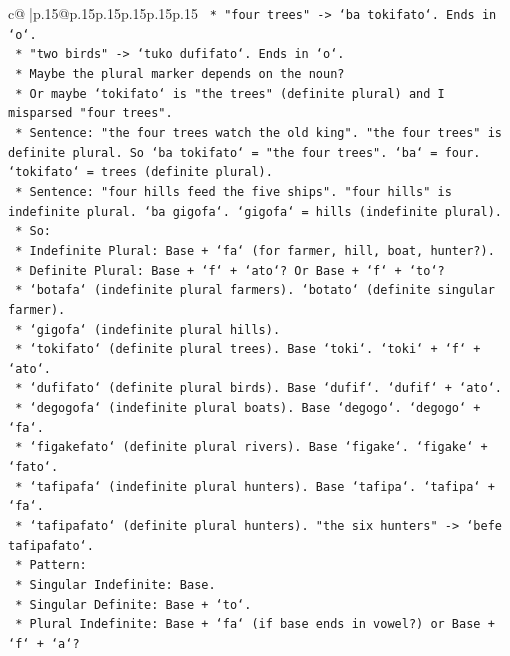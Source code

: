 \documentclass{article}
\begin{document}
{\begin{supertabular}{c@{$\;$}|p{.15\linewidth}@{}p{.15\linewidth}p{.15\linewidth}p{.15\linewidth}p{.15\linewidth}p{.15\linewidth}}
{{{\texttt{        *   "four trees" {-}> `ba tokifato`. Ends in `o`.} \\
\texttt{        *   "two birds" {-}> `tuko dufifato`. Ends in `o`.} \\
\texttt{        *   Maybe the plural marker depends on the noun?} \\
\texttt{        *   Or maybe `tokifato` is "the trees" (definite plural) and I misparsed "four trees".} \\
\texttt{        *   Sentence: "the four trees watch the old king". "the four trees" is definite plural. So `ba tokifato` = "the four trees". `ba` = four. `tokifato` = trees (definite plural).} \\
\texttt{        *   Sentence: "four hills feed the five ships". "four hills" is indefinite plural. `ba gigofa`. `gigofa` = hills (indefinite plural).} \\
\texttt{        *   So:} \\
\texttt{            *   Indefinite Plural: Base + `fa` (for farmer, hill, boat, hunter?).} \\
\texttt{            *   Definite Plural: Base + `f` + `ato`? Or Base + `f` + `to`?} \\
\texttt{            *   `botafa` (indefinite plural farmers). `botato` (definite singular farmer).} \\
\texttt{            *   `gigofa` (indefinite plural hills).} \\
\texttt{            *   `tokifato` (definite plural trees). Base `toki`. `toki` + `f` + `ato`.} \\
\texttt{            *   `dufifato` (definite plural birds). Base `dufif`. `dufif` + `ato`.} \\
\texttt{            *   `degogofa` (indefinite plural boats). Base `degogo`. `degogo` + `fa`.} \\
\texttt{            *   `figakefato` (definite plural rivers). Base `figake`. `figake` + `fato`.} \\
\texttt{            *   `tafipafa` (indefinite plural hunters). Base `tafipa`. `tafipa` + `fa`.} \\
\texttt{            *   `tafipafato` (definite plural hunters). "the six hunters" {-}> `befe tafipafato`.} \\
\texttt{        *   Pattern:} \\
\texttt{            *   Singular Indefinite: Base.} \\
\texttt{            *   Singular Definite: Base + `to`.} \\
\texttt{            *   Plural Indefinite: Base + `fa` (if base ends in vowel?) or Base + `f` + `a`?} \\
}}}
\end{supertabular}}
\end{document}

